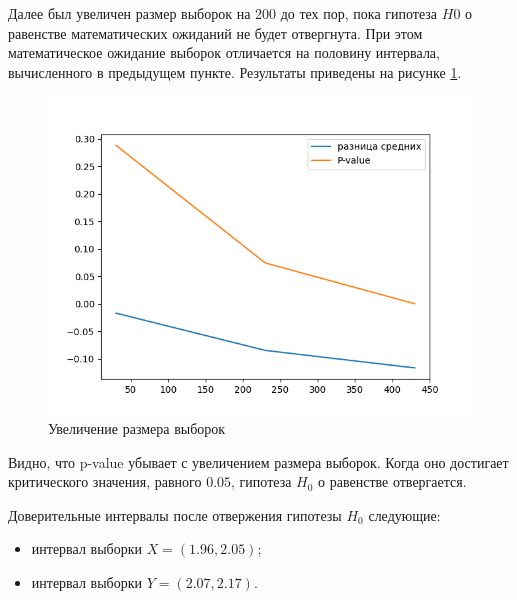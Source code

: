 \documentclass[12pt]{report}
\begin{document}
\newpage

Далее был увеличен размер выборок на 200 до тех пор, пока гипотеза $H0$ о равенстве математических ожиданий не будет отвергнута. При этом математическое ожидание выборок отличается на половину интервала, вычисленного в предыдущем пункте.  Результаты приведены на рисунке \ref{fig:task4}. 

\begin{figure}[h!]
  \centering
  \includegraphics[width = \linewidth]{diffs_4.png}
  \caption{Увеличение размера выборок}
  \label{fig:task4}
\end{figure}

Видно, что p-value убывает с увеличением размера выборок. Когда оно достигает критического значения, равного $0.05$, гипотеза $H_0$ о равенстве отвергается.

Доверительные интервалы после отвержения гипотезы $H_0$ следующие:
\begin{itemize}
    \item интервал выборки $X = (1.96, 2.05)$;
    \item интервал выборки $Y = (2.07, 2.17)$.
\end{itemize}

\printbibliography[title={СПИСОК ИСПОЛЬЗОВАННЫХ\\ ИСТОЧНИКОВ}]
\end{document}
